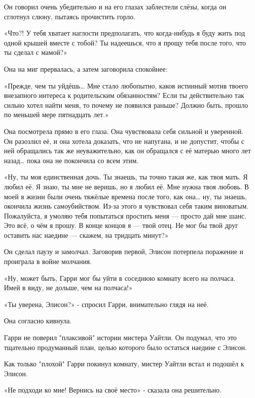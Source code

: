 \documentclass[a4paper,12pt]{book}
\begin{document}
\par
Он говорил очень убедительно и на его глазах заблестели слёзы, когда он сглотнул слюну, пытаясь прочистить горло.
\par
«Что?! У тебя хватает наглости предполагать, что когда-нибудь я буду жить под одной крышей вместе с тобой? Ты надеешься, что я прощу тебя после того, что ты сделал с мамой?»
\par
Она на миг прервалась, а затем заговорила спокойнее:
\par
«Прежде, чем ты уйдёшь… Мне стало любопытно, каков истинный мотив твоего внезапного интереса к родительским обязанностям? Если ты действительно так сильно хотел найти меня, то почему не появился раньше? Должно быть, прошло по меньшей мере пятнадцать лет.»
\par
Она посмотрела прямо в его глаза. Она чувствовала себя сильной и уверенной. Он разозлил её, и она хотела доказать, что не напугана, и не допустит, чтобы с ней обращались так же неуважительно, как он обращался с её матерью много лет назад… пока она не покончила со всем этим.
\par
«Ну, ты моя единственная дочь. Ты знаешь, ты точно такая же, как твоя мать. Я любил её. Я знаю, ты мне не веришь, но я любил её. Мне нужна твоя любовь. В моей в жизни были очень  тяжёлые времена после того, как она… ну, ты знаешь, окончила жизнь самоубийством. Из-за этого я чувствовал себя таким виноватым. Пожалуйста, я умоляю тебя попытаться простить меня — просто дай мне шанс. Это всё, о чём я прошу. В конце концов я — твой отец. Не мог бы твой друг оставить нас наедине — скажем, на тридцать минут?»
\par
Он сделал паузу и замолчал. Заговорив первой, Элисон потерпела поражение и проиграла в войне молчания.
\par
«Ну, может быть, Гарри мог бы уйти в соседнюю комнату всего на полчаса. Имей в виду, не дольше, чем на полчаса!»
\par
«Ты уверена, Элисон?» - спросил Гарри, внимательно глядя на неё.
\par
Она согласно кивнула.
\par
Гарри не поверил "плаксивой" истории мистера Уайтли. Он подумал, что это тщательно продуманный план, целью которого было остаться наедине с Элисон.\\
\par
Как только "плохой" Гарри покинул комнату, мистер Уайтли встал и подошёл к Элисон.
\par
«Не подходи ко мне! Вернись на своё место» - сказала она решительно.
\end{document}
